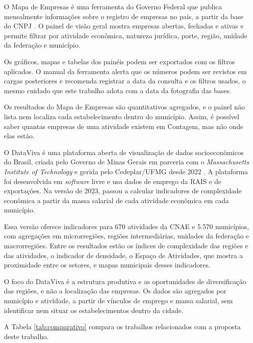 O Mapa de Empresas é uma ferramenta do Governo Federal que publica mensalmente informações sobre o registro de empresas no país, a partir da base do CNPJ \cite{brasil2026}.
O painel de visão geral mostra empresas abertas, fechadas e ativas e permite filtrar por atividade econômica, natureza jurídica, porte, região, unidade da federação e município.

Os gráficos, mapas e tabelas dos painéis podem ser exportados com os filtros aplicados.
O manual da ferramenta alerta que os números podem ser revistos em cargas posteriores e recomenda registrar a data da consulta e os filtros usados, o mesmo cuidado que este trabalho adota com a data da fotografia das bases.

Os resultados do Mapa de Empresas são quantitativos agregados, e o painel não lista nem localiza cada estabelecimento dentro do município.
Assim, é possível saber quantas empresas de uma atividade existem em Contagem, mas não onde elas estão.

O DataViva é uma plataforma aberta de visualização de dados socioeconômicos do Brasil, criada pelo Governo de Minas Gerais em parceria com o \textit{Massachusetts Institute of Technology} e gerida pelo Cedeplar/UFMG desde 2022 \cite{freitas2023}.
A plataforma foi desenvolvida em \textit{software} livre e usa dados de emprego da RAIS e de exportações.
Na versão de 2023, passou a calcular indicadores de complexidade econômica a partir da massa salarial de cada atividade econômica em cada município.

Essa versão oferece indicadores para 670 atividades da CNAE e 5.570 municípios, com agregações em microrregiões, regiões intermediárias, unidades da federação e macrorregiões.
Entre os resultados estão os índices de complexidade das regiões e das atividades, o indicador de densidade, o Espaço de Atividades, que mostra a proximidade entre os setores, e mapas municipais desses indicadores.

O foco do DataViva é a estrutura produtiva e as oportunidades de diversificação das regiões, e não a localização das empresas.
Os dados são agregados por município e atividade, a partir de vínculos de emprego e massa salarial, sem identificar nem situar os estabelecimentos dentro da cidade.

A Tabela \ref{tab:comparativo} compara os trabalhos relacionados com a proposta deste trabalho.

